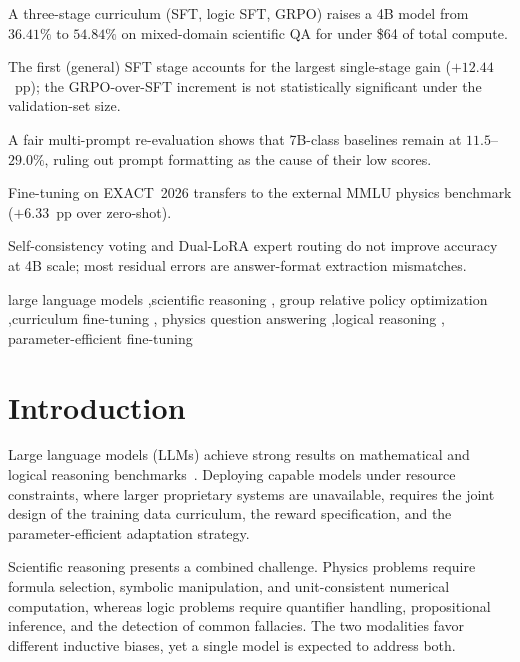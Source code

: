 \documentclass[preprint,12pt]{elsarticle}
\newcommand{\dataset}{EXACT~2026}
\begin{document}
\begin{frontmatter}
\begin{highlights}
\item A three-stage curriculum (SFT, logic SFT, GRPO) raises a 4B model
      from $36.41\%$ to $54.84\%$ on mixed-domain scientific QA for under
      \$64 of total compute.
\item The first (general) SFT stage accounts for the largest single-stage
      gain ($+12.44$~pp); the GRPO-over-SFT increment is not statistically
      significant under the validation-set size.
\item A fair multi-prompt re-evaluation shows that 7B-class baselines
      remain at $11.5$--$29.0\%$, ruling out prompt formatting as the cause
      of their low scores.
\item Fine-tuning on \dataset{} transfers to the external MMLU physics
      benchmark ($+6.33$~pp over zero-shot).
\item Self-consistency voting and Dual-LoRA expert routing do not improve
      accuracy at 4B scale; most residual errors are answer-format
      extraction mismatches.
\end{highlights}

\begin{keyword}
large language models \sep scientific reasoning \sep
group relative policy optimization \sep curriculum fine-tuning \sep
physics question answering \sep logical reasoning \sep
parameter-efficient fine-tuning
\end{keyword}

\end{frontmatter}

\section{Introduction}
\label{sec:intro}

Large language models (LLMs) achieve strong results on mathematical and
logical reasoning benchmarks~\cite{Wei2022,Wang2023sc,Kojima2022}.
Deploying capable models under resource constraints, where larger
proprietary systems are unavailable, requires the joint design of the
training data curriculum, the reward specification, and the
parameter-efficient adaptation strategy.

Scientific reasoning presents a combined challenge. Physics problems
require formula selection, symbolic manipulation, and unit-consistent
numerical computation, whereas logic problems require quantifier handling,
propositional inference, and the detection of common fallacies. The two
modalities favor different inductive biases, yet a single model is expected
to address both.
\end{document}
